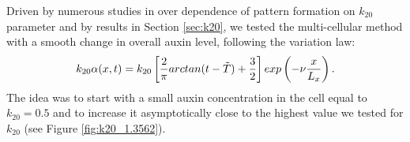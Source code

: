 Driven by numerous studies in \cite{intra2} over dependence of pattern formation on $k_{20}$ parameter and by results in Section \ref{sec:k20}, we tested the multi-cellular method with a smooth change in overall auxin level, following the variation law:
\begin{equation*}
  k_{20} \alpha(x,t) = k_{20} \left[\frac{2}{\pi} arctan(t - \Tilde{T}) + \frac{3}{2}\right] exp\left(- \nu \frac{x}{L_x}\right).
\end{equation*}
The idea was to start with a small auxin concentration in the cell equal to $k_{20} = 0.5$ and to increase it asymptotically close to the highest value we tested for $k_{20}$ (see Figure \ref{fig:k20_1.3562}).

